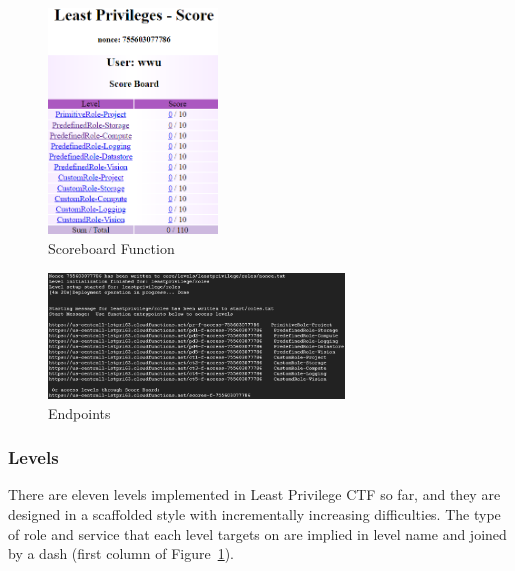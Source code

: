 \documentclass[a4paper,twoside]{article}
\begin{document}
\begin{figure}[!h]
  \centering
  \includegraphics[width=0.4\textwidth]{pic/score}
  \caption {Scoreboard Function}
  \label{fig:score}
\end{figure}

\begin{figure}[h]
  \centering
  \includegraphics[width=0.7\textwidth]{pic/endpoints}
  \caption {Endpoints}
   \label{fig:endpoints}
\end{figure}
\subsubsection{Levels}
There are eleven levels implemented in Least Privilege CTF so far, and they are designed in a scaffolded style with incrementally increasing difficulties. The type of role and service that each level targets on are implied in level name and joined by a dash (first column of Figure~\ref{fig:score}). 
\end{document}
